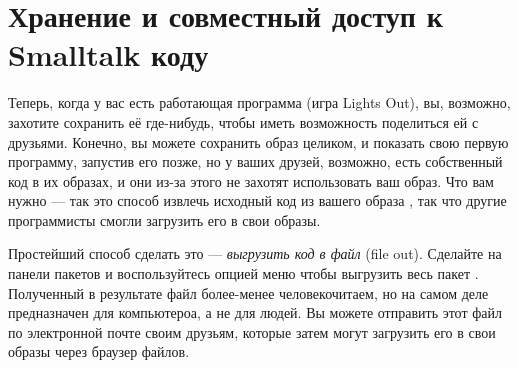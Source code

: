 \documentclass[a4paper,10pt,twoside]{book}
\begin{document}
{%
\section{Хранение и совместный доступ к Smalltalk коду}

Теперь, когда у вас есть работающая программа (игра Lights Out), вы, возможно, захотите сохранить её где-нибудь, чтобы иметь возможность поделиться ей с друзьями. Конечно, вы можете сохранить образ \pharo целиком, и показать свою первую программу, запустив его позже, но у ваших друзей, возможно, есть собственный код в их образах, и они из-за этого не захотят использовать ваш образ.
Что вам нужно --- так это способ извлечь исходный код из вашего образа \pharo, так что другие программисты смогли загрузить его в свои образы.

Простейший способ сделать это --- \emph{выгрузить код в файл} (file out). Сделайте \actclick на панели пакетов и воспользуйтесь опцией меню  чтобы выгрузить весь пакет .
Полученный в результате файл более-менее человекочитаем, но на самом деле предназначен для компьютероа, а не для людей.
Вы можете отправить этот файл по электронной почте своим друзьям, которые затем могут загрузить его в свои образы \pharo через браузер файлов.

}
\end{document}
